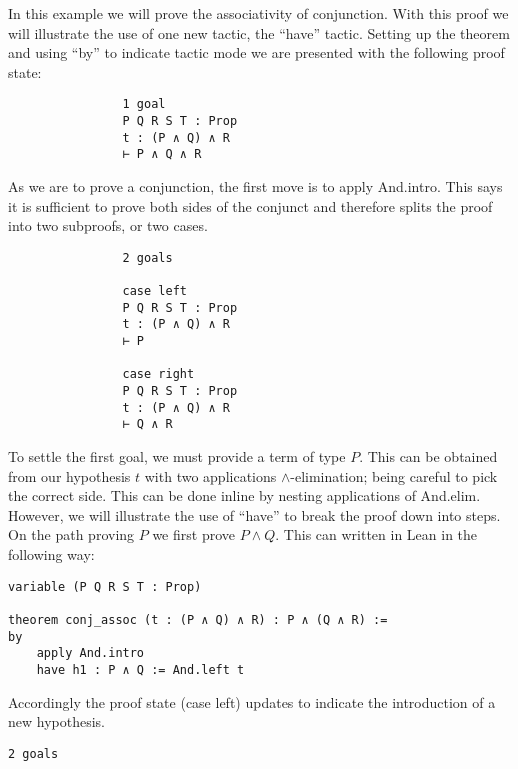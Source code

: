 \documentclass{book}
\begin{document}
    \newpage
    \begin{eg}
        In this example we will prove the associativity of conjunction. With this proof we will illustrate the use of one new tactic, the ``have'' tactic. Setting up the theorem and using ``by'' to indicate tactic mode we are presented with the following proof state: 
        \begin{center}
            \begin{lstlisting}
                1 goal
                P Q R S T : Prop
                t : (P ∧ Q) ∧ R
                ⊢ P ∧ Q ∧ R
            \end{lstlisting}            
        \end{center}
        As we are to prove a conjunction, the first move is to apply And.intro. This says it is sufficient to prove both sides of the conjunct and therefore splits the proof into two subproofs, or two cases. 
        \begin{center}
            \begin{lstlisting}
                2 goals

                case left
                P Q R S T : Prop
                t : (P ∧ Q) ∧ R
                ⊢ P
                
                case right
                P Q R S T : Prop
                t : (P ∧ Q) ∧ R
                ⊢ Q ∧ R
            \end{lstlisting}            
        \end{center}
        To settle the first goal, we must provide a term of type $P$. This can be obtained from our hypothesis $t$ with two applications $\land$-elimination; being careful to pick the correct side. This can be done inline by nesting applications of And.elim. However, we will illustrate the use of ``have'' to break the proof down into steps. On the path proving $P$ we first prove $P \land Q$. This can written in Lean in the following way:
        \begin{center}
            \begin{lstlisting}
variable (P Q R S T : Prop)

theorem conj_assoc (t : (P ∧ Q) ∧ R) : P ∧ (Q ∧ R) :=
by
    apply And.intro
    have h1 : P ∧ Q := And.left t
            \end{lstlisting}            
        \end{center}
        Accordingly the proof state (case left) updates to indicate the introduction of a new hypothesis. 
        \begin{center}
            \begin{lstlisting}
2 goals


\end{lstlisting}
\end{center}
\end{eg}
\end{document}
